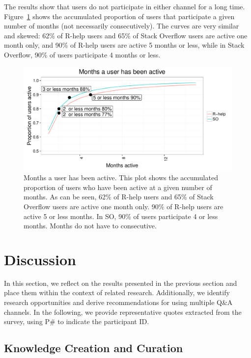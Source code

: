 \documentclass[smallextended]{svjour3}       %
\newcommand{\SO}{Stack Overflow\xspace}
\newcommand{\RH}{R-help\xspace}
\begin{document}
The results show that users do not participate in either channel for a long
time. Figure~\ref{fig:monthsPerUser} shows the accumulated proportion of users that participate a given number of
months (not necessarily consecutively). The curves are very similar and skewed: 62\% of \RH users and 65\% of \SO users are active one month only, and
90\% of \RH users are active 5 months or less, while in \SO, 90\% of users participate 4 months or less.

\begin{figure}[htbp]
  \centering
  \includegraphics[width=.95\textwidth]{figs/monthsPerUser.pdf}
  \caption{Months a user has been active. This plot shows the accumulated proportion of users who have been active at a
    given number of months. As can be seen, 62\% of \RH users and 65\% of \SO users are active one month only.
    90\% of \RH users are active 5 or less months. In SO, 90\% of users participate 4 or less months. Months do not have
  to consecutive.}
  \label{fig:monthsPerUser}
\end{figure}



\section{Discussion}
\label{cha:theory}

In this section, we reflect on the results presented in the previous section and place them within the context of related research. Additionally, we identify research opportunities and derive recommendations for using multiple Q\&A channels.
In the following, we provide representative quotes extracted from the survey, using P\# to indicate the participant ID.

\subsection{Knowledge Creation and Curation}
\end{document}
